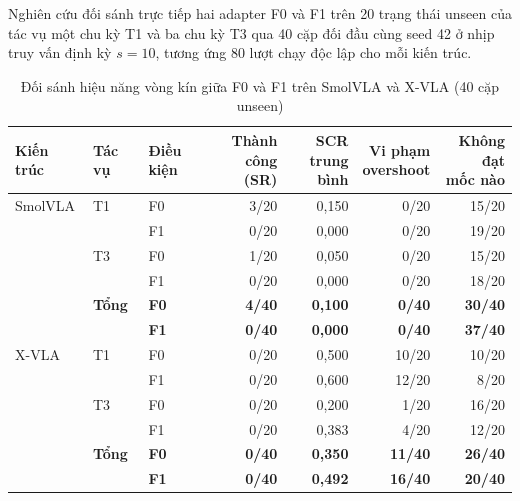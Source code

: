 Nghiên cứu đối sánh trực tiếp hai adapter F0 và F1 trên 20 trạng thái unseen của tác vụ một chu kỳ T1 và ba chu kỳ T3 qua 40 cặp đối đầu cùng seed 42 ở nhịp truy vấn định kỳ $s = 10$, tương ứng 80 lượt chạy độc lập cho mỗi kiến trúc.

\begin{table}[htbp]
\centering\small
\caption{Đối sánh hiệu năng vòng kín giữa F0 và F1 trên SmolVLA và X-VLA (40 cặp unseen)}
\label{tab:e2-comparison}
\label{tab:e2-unseen-results}
\label{tab:xvla-e2-results}
\setlength{\tabcolsep}{4.5pt}
\begin{tabular}{l|l|l|r|r|r|r}
\toprule
\textbf{Kiến trúc} & \textbf{Tác vụ} & \textbf{Điều kiện} & \shortstack{\textbf{Thành công}\\\textbf{(SR)}} & \shortstack{\textbf{SCR}\\\textbf{trung bình}} & \shortstack{\textbf{Vi phạm}\\\textbf{overshoot}} & \shortstack{\textbf{Không đạt}\\\textbf{mốc nào}} \\
\midrule
SmolVLA & T1 & F0 & 3/20 & 0,150 & 0/20 & 15/20 \\
        &    & F1 & 0/20 & 0,000 & 0/20 & 19/20 \\
        & T3 & F0 & 1/20 & 0,050 & 0/20 & 15/20 \\
        &    & F1 & 0/20 & 0,000 & 0/20 & 18/20 \\
        \cmidrule{2-7}
        & \textbf{Tổng} & \textbf{F0} & \textbf{4/40} & \textbf{0,100} & \textbf{0/40} & \textbf{30/40} \\
        &               & \textbf{F1} & \textbf{0/40} & \textbf{0,000} & \textbf{0/40} & \textbf{37/40} \\
\midrule
X-VLA   & T1 & F0 & 0/20 & 0,500 & 10/20 & 10/20 \\
        &    & F1 & 0/20 & 0,600 & 12/20 & 8/20 \\
        & T3 & F0 & 0/20 & 0,200 & 1/20 & 16/20 \\
        &    & F1 & 0/20 & 0,383 & 4/20 & 12/20 \\
        \cmidrule{2-7}
        & \textbf{Tổng} & \textbf{F0} & \textbf{0/40} & \textbf{0,350} & \textbf{11/40} & \textbf{26/40} \\
        &               & \textbf{F1} & \textbf{0/40} & \textbf{0,492} & \textbf{16/40} & \textbf{20/40} \\
\bottomrule
\end{tabular}
\end{table}


